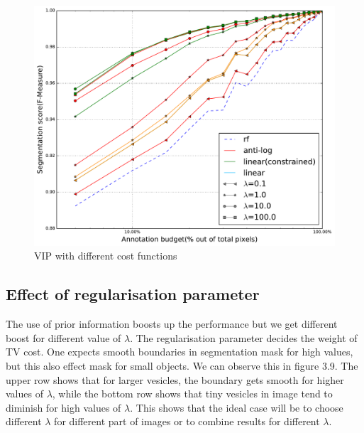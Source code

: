 \begin{figure}[h!] \label{fig:rf_vip_diff}
 \includegraphics[width=1.0\linewidth]{figures/vip_diff.pdf}
\caption{VIP with different cost functions}
\end{figure}


\subsection{Effect of regularisation parameter}
The use of prior information boosts up the performance but we get different boost for different value of $\lambda$. The regularisation parameter decides the weight of TV cost. One expects smooth boundaries in segmentation mask for high values, but this also effect mask for small objects. We can observe this in figure 3.9. The upper row shows that for larger vesicles, the boundary gets smooth for higher values of $\lambda$, while the bottom row shows that tiny vesicles in image tend to diminish for high values of $\lambda$. This shows that the ideal case will be to choose different $\lambda$ for different part of images or to combine results for different $\lambda$. 

